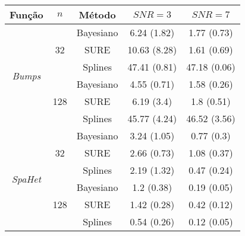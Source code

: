 \documentclass[preview, border=0pt]{standalone}
\begin{document}
\begin{tabular}{ccccc}\hline\hline
	Função                     & $n$  	 	          & Método    & $SNR=3$ & $SNR=7$\\\hline
\multirow{6}{*}{\textit{Bumps}}& \multirow{3}{*}{32}  & Bayesiano & 6.24 (1.82) & 1.77 (0.73) \\
							   &					  & SURE      & 10.63 (8.28) & 1.61 (0.69) \\
		                       &					  & Splines   & 47.41 (0.81) & 47.18 (0.06) \\\cline{2-5}
		                       & \multirow{3}{*}{128} & Bayesiano & 4.55 (0.71) & 1.58 (0.26) \\
		                       &					  & SURE      & 6.19 (3.4) & 1.8 (0.51) \\
	                           &					  & Splines   & 45.77 (4.24) & 46.52 (3.56) \\\hline
\multirow{6}{*}{\textit{SpaHet}}		
	 	& \multirow{3}{*}{32} & Bayesiano & 3.24 (1.05) & 0.77 (0.3) \\
		&					  & SURE      & 2.66 (0.73) & 1.08 (0.37) \\
		&					  & Splines   & 2.19 (1.32) & 0.47 (0.24) \\\cline{2-5}
		& \multirow{3}{*}{128}& Bayesiano & 1.2 (0.38) & 0.19 (0.05) \\
		&					  & SURE      & 1.42 (0.28) & 0.42 (0.12) \\
		&					  & Splines   & 0.54 (0.26) & 0.12 (0.05) \\\hline\hline
\end{tabular}
\end{document}
